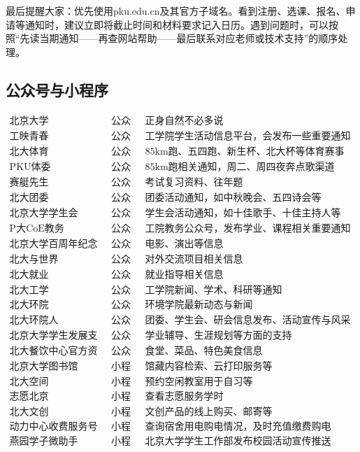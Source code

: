 \documentclass[11pt,oneside]{book}
\begin{document}
\vspace{10pt}

最后提醒大家：优先使用pku.edu.cn及其官方子域名。看到注册、选课、报名、申请等通知时，建议立即将截止时间和材料要求记入日历。遇到问题时，可以按照“先读当期通知——再查网站帮助——最后联系对应老师或技术支持”的顺序处理。
	
\newpage

\subsection{公众号与小程序}

\[
\begin{matrix}
	\text{北京大学} & \text{公众号} & \text{正身自然不必多说}\\
	\text{工映青春} & \text{公众号} & \text{工学院学生活动信息平台，会发布一些重要通知}\\
	\text{北大体育} & \text{公众号} & \text{85km跑、五四跑、新生杯、北大杯等体育赛事通知}\\
	\text{PKU体委} & \text{公众号} & \text{85km跑相关通知，周二、周四夜奔点歌渠道}\\
	\text{赛艇先生} & \text{公众号} & \text{考试复习资料、往年题}\\
	\text{北大团委} & \text{公众号} & \text{团委活动通知，如中秋晚会、五四诗会等}\\
	\text{北京大学学生会} & \text{公众号} & \text{学生会活动通知，如十佳歌手、十佳主持人等}\\
	\text{P大CoE教务} & \text{公众号} & \text{工院教务公众号，发布学业、课程相关重要通知}\\
	\text{北京大学百周年纪念讲堂} & \text{公众号} & \text{电影、演出等信息}\\
	\text{北大与世界} & \text{公众号} & \text{对外交流项目相关信息}\\
	\text{北大就业} & \text{公众号} & \text{就业指导相关信息}\\
	\text{北大工学} & \text{公众号} & \text{工学院新闻、学术、科研等通知}\\
	\text{北大环院} & \text{公众号} & \text{环境学院最新动态与新闻}\\
	\text{北大环院人} & \text{公众号} & \text{团委、学生会、研会信息发布、活动宣传与风采展示平台}\\
	\text{北京大学学生发展支持} & \text{公众号} & \text{学业辅导、生涯规划等方面的支持}\\
	\text{北大餐饮中心官方资讯} & \text{公众号} & \text{食堂、菜品、特色美食信息}\\
	\text{北京大学图书馆} & \text{小程序} & \text{馆藏内容检索、云打印服务等}\\
	\text{北大空间} & \text{小程序} & \text{预约空闲教室用于自习等}\\
	\text{志愿北京} & \text{小程序} & \text{查看志愿服务学时}\\
	\text{北大文创} & \text{小程序} & \text{文创产品的线上购买、邮寄等}\\
	\text{动力中心收费服务号} & \text{小程序} & \text{查询宿舍用电购电情况，及时充值缴费购电}\\
	\text{燕园学子微助手} & \text{小程序} & \text{北京大学学生工作部发布校园活动宣传推送}\\
\end{matrix}
\]
\end{document}
